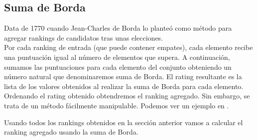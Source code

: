 \subsection{Suma de Borda}
Data de 1770 cuando Jean-Charles de Borda lo planteó como método para agregar rankings de candidatos tras unas elecciones.\\

Por cada ranking de entrada (que puede contener empates), cada elemento recibe una puntuación igual al número de elementos que supera. A continuación, sumamos las puntuaciones para cada elemento del conjunto obteniendo un número natural que denominaremos suma de Borda. El rating resultante es la lista de los valores obtenidos al realizar la suma de Borda para cada elemento.\\

Ordenando el rating obtenido obtendremos el ranking agregado. Sin embargo, se trata de un método fácilmente manipulable. Podemos ver un ejemplo en \cite[pág 854]{refborda}.

\newpage

\begin{ejem} Usando todos los rankings obtenidos en la sección anterior vamos a calcular el ranking agregado usando la suma de Borda.
\end{ejem}

